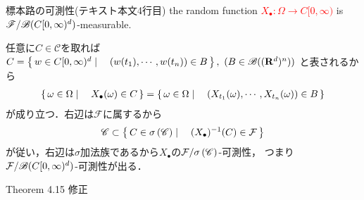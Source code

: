 	\begin{itembox}[l]{標本路の可測性(テキスト本文4行目)}
		the random function \textcolor{red}{$X_\bullet:\Omega \longrightarrow C[0,\infty)$}
		is \textcolor{red}{$\mathscr{F}/\mathscr{B}(C[0,\infty)^d)$}-measurable.
	\end{itembox}
	
	\begin{prf}
		任意に$C \in \mathscr{C}$を取れば$C = \left\{\, w \in C[0,\infty)^d \mid \quad (w(t_1),\cdots,w(t_n)) \in B\, \right\}, \ (B \in \mathscr{B}((\mathbf{R}^d)^n))$
		と表されるから
		\begin{align}
			\left\{\, \omega \in \Omega \mid \quad X_{\bullet}(\omega) \in C\, \right\}
			= \left\{\, \omega \in \Omega \mid \quad \left(X_{t_1}(\omega), \cdots, X_{t_n}(\omega)\right) \in B\, \right\}
		\end{align}
		が成り立つ．右辺は$\mathcal{F}$に属するから
		\begin{align}
			\mathscr{C} \subset \left\{\, C \in \sigma \left(\mathscr{C}\right) \mid \quad (X_{\bullet})^{-1}(C) \in \mathcal{F}\, \right\}
		\end{align}
		が従い，右辺は$\sigma$加法族であるから$X_{\bullet}$の$\mathcal{F}/\sigma \left(\mathscr{C}\right)$-可測性，
		つまり$\mathcal{F}/\mathscr{B}(C[0,\infty)^d)$-可測性が出る．
		\QED
	\end{prf}

	\begin{itembox}[l]{}
	\end{itembox}
	
	\begin{itembox}[l]{Theorem 4.15 修正}
		
	\end{itembox}
	
